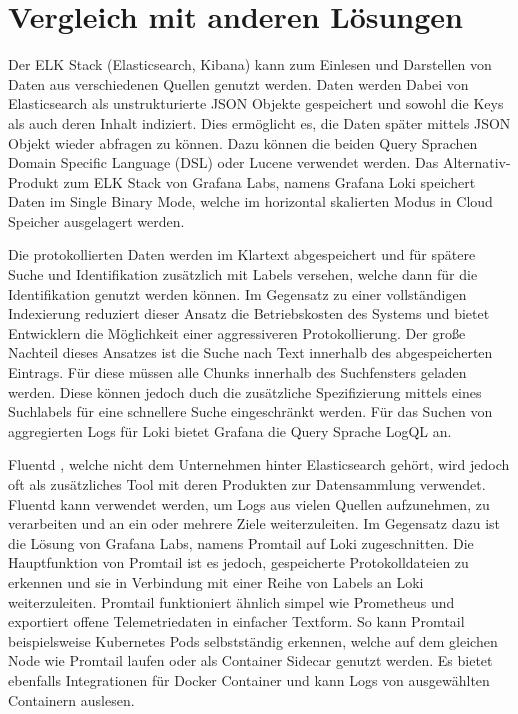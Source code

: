 \section{Vergleich mit anderen Lösungen}
Der ELK Stack (Elasticsearch, Kibana) kann zum Einlesen und Darstellen von Daten aus verschiedenen Quellen genutzt werden.
Daten werden Dabei von Elasticsearch als unstrukturierte JSON Objekte gespeichert und sowohl die Keys als auch deren Inhalt indiziert.
Dies ermöglicht es, die Daten später mittels JSON Objekt wieder abfragen zu können. Dazu können die beiden Query Sprachen Domain Specific Language (DSL) oder Lucene verwendet werden.
Das Alternativ-Produkt zum ELK Stack von Grafana Labs,
namens Grafana Loki \cite{grafanaLokiWebsite} speichert Daten
im Single Binary Mode, welche im horizontal skalierten Modus in Cloud Speicher ausgelagert werden. 
\cite{GrafanaL66:online}


Die protokollierten Daten werden im Klartext abgespeichert und für spätere Suche und Identifikation zusätzlich mit Labels versehen, welche dann für die Identifikation genutzt werden können.
Im Gegensatz zu einer vollständigen Indexierung reduziert dieser Ansatz die Betriebskosten des Systems und bietet Entwicklern die Möglichkeit einer aggressiveren Protokollierung. 
Der große Nachteil dieses Ansatzes ist die Suche nach Text innerhalb des abgespeicherten Eintrags. 
Für diese müssen alle Chunks innerhalb des Suchfensters geladen werden. 
Diese können jedoch duch die zusätzliche Spezifizierung mittels eines Suchlabels für eine schnellere Suche eingeschränkt werden.
Für das Suchen von aggregierten Logs für Loki bietet Grafana die Query Sprache LogQL an.
\cite{Comparis37:online}



Fluentd \cite{fluentdWebsite}, welche nicht dem Unternehmen hinter Elasticsearch gehört, wird jedoch oft als zusätzliches Tool mit deren Produkten zur Datensammlung verwendet. 
Fluentd kann verwendet werden, um Logs aus vielen Quellen aufzunehmen, zu verarbeiten und an ein oder mehrere Ziele weiterzuleiten.
Im Gegensatz dazu ist die Lösung von Grafana Labs,
namens Promtail \cite{promtailWebsite} auf Loki zugeschnitten. 
Die Hauptfunktion von Promtail ist es jedoch, gespeicherte Protokolldateien zu erkennen und sie in Verbindung mit einer Reihe von Labels an Loki weiterzuleiten. Promtail funktioniert
ähnlich simpel wie Prometheus und exportiert offene Telemetriedaten in einfacher Textform.
So kann Promtail beispielsweise Kubernetes Pods selbstständig erkennen, welche auf dem gleichen Node wie Promtail laufen oder als Container Sidecar genutzt werden.
Es bietet ebenfalls Integrationen für Docker Container und kann Logs von ausgewählten Containern auslesen. 

